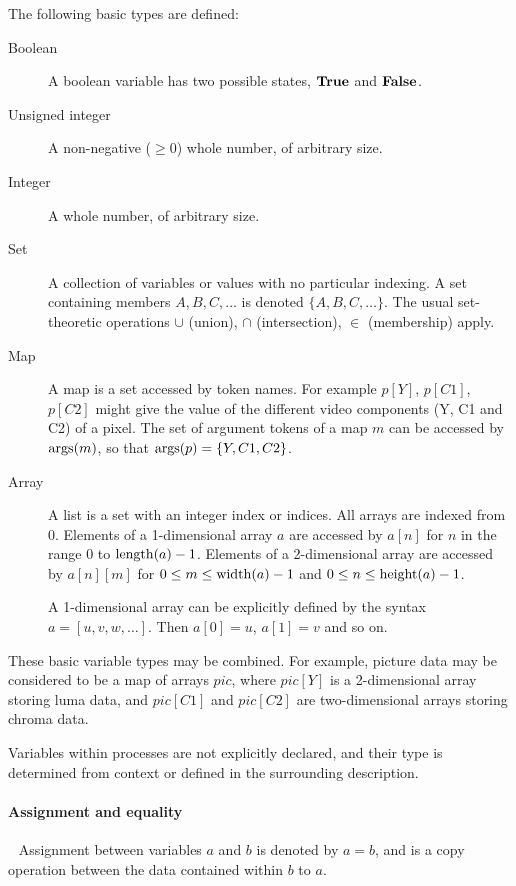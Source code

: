 The following basic types are defined:
\begin{description}
\item[Boolean] A boolean variable has two possible states, $\text{\bf{True}}$ and $\text{\bf{False}}$.

\item[Unsigned integer] A non-negative ($\geq 0$) whole number, of arbitrary size.

\item[Integer] A whole number, of arbitrary size.

\item[Set] A collection of variables or values with no particular indexing. 
A set containing members $A,B,C,\ldots$ is denoted $\{A,B,C,\ldots\}$. The usual
set-theoretic operations $\cup$ (union), $\cap$ (intersection), $\in$ (membership)
apply.

\item[Map]

A map is a set accessed by token names. For example
$p[Y]$, $p[C1]$, $p[C2]$ might give the value of the different video components
(Y, C1 and C2) of a pixel. The set of argument tokens of a map $m$ can be accessed by $\operatorname{args}(m)$,
so that $\operatorname{args}(p)=\{Y,C1,C2\}$.

\item[Array] 

A list is a set with an integer index or indices. All arrays are indexed from 0. 
Elements of a 1-dimensional array $a$ are accessed by $a[n]$ for $n$ in the
range 0 to $\operatorname{length}(a)-1$. Elements of a 2-dimensional array are accessed by
$a[n][m]$ for $0\leq m\leq\operatorname{width}(a)-1$ and $0\leq n\leq\operatorname{height}(a)-1$.

A 1-dimensional array can be explicitly defined by the syntax $a=[u, v, w, \hdots]$.
Then $a[0]=u$, 
$a[1]=v$ and so on.

\end{description}

These basic variable types may be combined. For example, picture data may be considered
to be a map of arrays $pic$, where $pic[Y]$ is a 2-dimensional array storing luma data,
and $pic[C1]$ and $pic[C2]$ are two-dimensional arrays storing chroma data.

Variables within processes are not explicitly declared, and their type is determined from
context or defined in the surrounding description.

\paragraph{Assignment and equality}
$\ $\newline$\ $\newline
Assignment between variables $a$ and $b$ is denoted by $a=b$, and is a copy
operation between the data contained within $b$ to $a$. 


